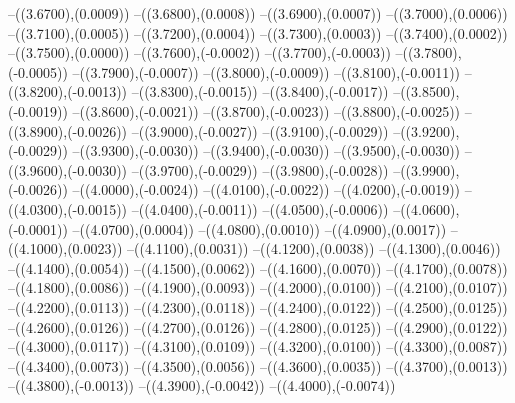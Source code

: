 {	--({\sx*(3.6700)},{\sy*(0.0009)})
	--({\sx*(3.6800)},{\sy*(0.0008)})
	--({\sx*(3.6900)},{\sy*(0.0007)})
	--({\sx*(3.7000)},{\sy*(0.0006)})
	--({\sx*(3.7100)},{\sy*(0.0005)})
	--({\sx*(3.7200)},{\sy*(0.0004)})
	--({\sx*(3.7300)},{\sy*(0.0003)})
	--({\sx*(3.7400)},{\sy*(0.0002)})
	--({\sx*(3.7500)},{\sy*(0.0000)})
	--({\sx*(3.7600)},{\sy*(-0.0002)})
	--({\sx*(3.7700)},{\sy*(-0.0003)})
	--({\sx*(3.7800)},{\sy*(-0.0005)})
	--({\sx*(3.7900)},{\sy*(-0.0007)})
	--({\sx*(3.8000)},{\sy*(-0.0009)})
	--({\sx*(3.8100)},{\sy*(-0.0011)})
	--({\sx*(3.8200)},{\sy*(-0.0013)})
	--({\sx*(3.8300)},{\sy*(-0.0015)})
	--({\sx*(3.8400)},{\sy*(-0.0017)})
	--({\sx*(3.8500)},{\sy*(-0.0019)})
	--({\sx*(3.8600)},{\sy*(-0.0021)})
	--({\sx*(3.8700)},{\sy*(-0.0023)})
	--({\sx*(3.8800)},{\sy*(-0.0025)})
	--({\sx*(3.8900)},{\sy*(-0.0026)})
	--({\sx*(3.9000)},{\sy*(-0.0027)})
	--({\sx*(3.9100)},{\sy*(-0.0029)})
	--({\sx*(3.9200)},{\sy*(-0.0029)})
	--({\sx*(3.9300)},{\sy*(-0.0030)})
	--({\sx*(3.9400)},{\sy*(-0.0030)})
	--({\sx*(3.9500)},{\sy*(-0.0030)})
	--({\sx*(3.9600)},{\sy*(-0.0030)})
	--({\sx*(3.9700)},{\sy*(-0.0029)})
	--({\sx*(3.9800)},{\sy*(-0.0028)})
	--({\sx*(3.9900)},{\sy*(-0.0026)})
	--({\sx*(4.0000)},{\sy*(-0.0024)})
	--({\sx*(4.0100)},{\sy*(-0.0022)})
	--({\sx*(4.0200)},{\sy*(-0.0019)})
	--({\sx*(4.0300)},{\sy*(-0.0015)})
	--({\sx*(4.0400)},{\sy*(-0.0011)})
	--({\sx*(4.0500)},{\sy*(-0.0006)})
	--({\sx*(4.0600)},{\sy*(-0.0001)})
	--({\sx*(4.0700)},{\sy*(0.0004)})
	--({\sx*(4.0800)},{\sy*(0.0010)})
	--({\sx*(4.0900)},{\sy*(0.0017)})
	--({\sx*(4.1000)},{\sy*(0.0023)})
	--({\sx*(4.1100)},{\sy*(0.0031)})
	--({\sx*(4.1200)},{\sy*(0.0038)})
	--({\sx*(4.1300)},{\sy*(0.0046)})
	--({\sx*(4.1400)},{\sy*(0.0054)})
	--({\sx*(4.1500)},{\sy*(0.0062)})
	--({\sx*(4.1600)},{\sy*(0.0070)})
	--({\sx*(4.1700)},{\sy*(0.0078)})
	--({\sx*(4.1800)},{\sy*(0.0086)})
	--({\sx*(4.1900)},{\sy*(0.0093)})
	--({\sx*(4.2000)},{\sy*(0.0100)})
	--({\sx*(4.2100)},{\sy*(0.0107)})
	--({\sx*(4.2200)},{\sy*(0.0113)})
	--({\sx*(4.2300)},{\sy*(0.0118)})
	--({\sx*(4.2400)},{\sy*(0.0122)})
	--({\sx*(4.2500)},{\sy*(0.0125)})
	--({\sx*(4.2600)},{\sy*(0.0126)})
	--({\sx*(4.2700)},{\sy*(0.0126)})
	--({\sx*(4.2800)},{\sy*(0.0125)})
	--({\sx*(4.2900)},{\sy*(0.0122)})
	--({\sx*(4.3000)},{\sy*(0.0117)})
	--({\sx*(4.3100)},{\sy*(0.0109)})
	--({\sx*(4.3200)},{\sy*(0.0100)})
	--({\sx*(4.3300)},{\sy*(0.0087)})
	--({\sx*(4.3400)},{\sy*(0.0073)})
	--({\sx*(4.3500)},{\sy*(0.0056)})
	--({\sx*(4.3600)},{\sy*(0.0035)})
	--({\sx*(4.3700)},{\sy*(0.0013)})
	--({\sx*(4.3800)},{\sy*(-0.0013)})
	--({\sx*(4.3900)},{\sy*(-0.0042)})
	--({\sx*(4.4000)},{\sy*(-0.0074)})
}
